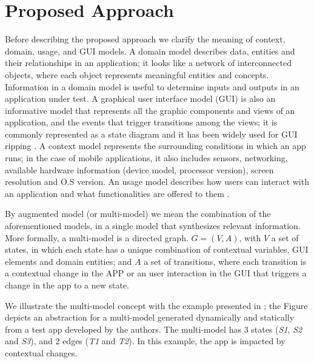 \chapter{Proposed Approach}
\label{chapter3}
Before describing the proposed approach we clarify the meaning of context, domain, usage, and GUI models. A domain model describes data, entities and their relationships in an application; it looks like a network of interconnected objects, where each object represents meaningful entities and concepts. Information in a domain model is useful to determine inputs and outputs in an application under test. A graphical user interface model (GUI) is also an informative model that represents all the graphic components and views of an application, and the events that trigger transitions among the views; it is commonly represented as a state diagram and it has been widely used for GUI ripping \cite{amalfitano_fasolino_tramontana_carmine_memon_2012}. A context model \cite{crashscope} represents the surrounding conditions in which an app runs; in the case of mobile applications, it also includes sensors, networking, available hardware information (\eg device model, processor version), screen resolution and O.S version. An usage model describes how users can interact with an application and what functionalities are offered to them \cite{monkeylab}.

By augmented model (or multi-model) we mean the combination of the aforementioned models, in a single model that synthesizes relevant information.  
More formally, a multi-model is a directed graph. $G = (V,A)$, with
$V $ a set of states, in which each state has a unique combination of contextual variables,  GUI elements and domain entities; and 
$A$ a set of transitions, where each transition is a contextual change in the APP or an user interaction in the GUI that triggers a change in the app to a new state.

We illustrate the multi-model concept with the example presented in ; the Figure depicts an abstraction for a multi-model  generated dynamically and statically from a test app developed by the authors. The multi-model  has 3 states (\textit{S1}, \textit{S2} and \textit{S3}), and 2 edges (\textit{T1} and \textit{T2}). In this example, the app is impacted by contextual changes. %


